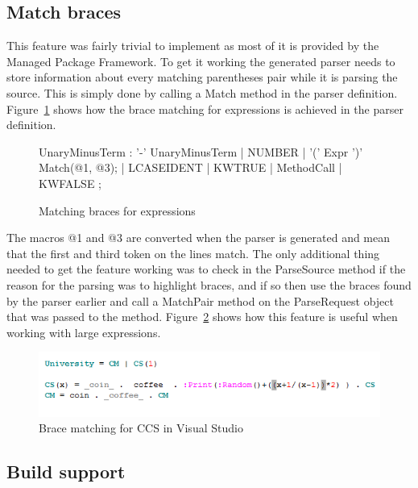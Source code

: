 	\subsection{Match braces}
	
	This feature was fairly trivial to implement as most of it is provided by 
	the Managed Package Framework. To get it working the generated parser needs 
	to store information about every matching parentheses pair while it is 
	parsing the source. This is simply done by calling a \textsf{Match} method 
	in the parser definition. Figure~\ref{fig:matchbrace} shows how the brace 
	matching for expressions is achieved in the parser definition.

\begin{figure}
\begin{codeblock}	
UnaryMinusTerm
    : '-' UnaryMinusTerm
    | NUMBER
    | '(' Expr ')'  { Match(@1, @3); }
    | LCASEIDENT
    | KWTRUE
    | MethodCall
    | KWFALSE
    ;
\end{codeblock}
\caption{Matching braces for expressions}
\label{fig:matchbrace}
\end{figure}

	The macros @1 and @3 are converted when the parser is generated and mean 
	that the first and third token on the lines match. The only additional thing 
	needed to get the feature working was to check in the \textsf{ParseSource} 
	method if the reason for the parsing was to highlight braces, and if so then 
	use the braces found by the parser earlier and call a \textsf{MatchPair} 
	method on the \textsf{ParseRequest} object that was passed to the method. 
	Figure~\ref{fig:matchbraces} shows how this feature is useful when working 
	with large expressions.
	
	\begin{figure}[h!]
		\centering
		\includegraphics[scale=0.75]{matchbraces.png}
		\caption{Brace matching for CCS in Visual Studio}
		\label{fig:matchbraces}
	\end{figure}
		
	
	\subsection{Build support}\label{msbuild}
	
